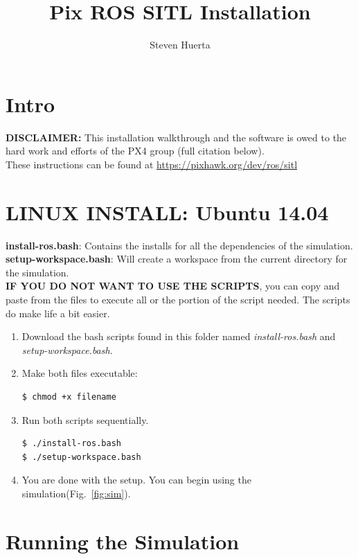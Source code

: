 \documentclass[10pt,a4paper,notitlepage]{report}
\author{Steven Huerta}
\title{Pix ROS SITL Installation}
\begin{document}
\maketitle
\section*{Intro}
\noindent \textbf{DISCLAIMER:} This installation walkthrough and the software is owed to the hard work and efforts of the PX4 group (full citation below).\\

\noindent These instructions can be found at \hspace{2mm} \url{https://pixhawk.org/dev/ros/sitl}\\

\section*{LINUX INSTALL: Ubuntu 14.04}

\noindent \textbf{install-ros.bash}: Contains the installs for all the dependencies of the simulation.\\
\noindent \textbf{setup-workspace.bash}: Will create a workspace from the current directory for the simulation.\\

\noindent \textbf{IF YOU DO NOT WANT TO USE THE SCRIPTS}, you can copy and paste from the files to execute all or the portion of the script needed. The scripts do make life a bit easier.\\
\begin{enumerate}
\item Download the bash scripts found in this folder named \textit{install-ros.bash} and \textit{setup-workspace.bash}.
\item Make both files executable:
\begin{lstlisting}[language=bash]
$ chmod +x filename
\end{lstlisting}
\item Run both scripts sequentially. 
\begin{lstlisting}[language=bash]
$ ./install-ros.bash
$ ./setup-workspace.bash
\end{lstlisting}
\item You are done with the setup. You can begin using the simulation(Fig.~\ref{fig:sim}).
\end{enumerate}

\section*{Running the Simulation}
\end{document}
